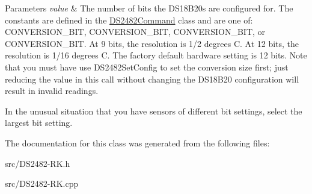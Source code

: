 \begin{DoxyParams}{Parameters}
{\em value} & The number of bits the D\+S18\+B20s are configured for. The constants are defined in the \mbox{\hyperlink{class_d_s2482_command}{D\+S2482\+Command}} class and are one of\+: C\+O\+N\+V\+E\+R\+S\+I\+O\+N\+\_\+B\+IT, C\+O\+N\+V\+E\+R\+S\+I\+O\+N\+\_\+B\+IT, C\+O\+N\+V\+E\+R\+S\+I\+O\+N\+\_\+B\+IT, or C\+O\+N\+V\+E\+R\+S\+I\+O\+N\+\_\+B\+IT. At 9 bits, the resolution is 1/2 degrees C. At 12 bits, the resolution is 1/16 degrees C. The factory default hardware setting is 12 bits. Note that you must have use D\+S2482\+Set\+Config to set the conversion size first; just reducing the value in this call without changing the D\+S18\+B20 configuration will result in invalid readings.\\
\hline
\end{DoxyParams}
In the unusual situation that you have sensors of different bit settings, select the largest bit setting. 

The documentation for this class was generated from the following files\+:\begin{DoxyCompactItemize}
\item 
src/D\+S2482-\/\+R\+K.\+h\item 
src/D\+S2482-\/\+R\+K.\+cpp\end{DoxyCompactItemize}
